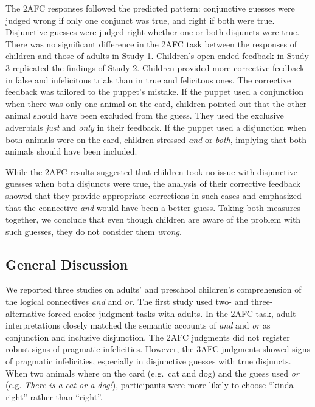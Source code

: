 \documentclass[floatsintext,man]{apa6}
\theoremstyle{definition}
\theoremstyle{definition}
\theoremstyle{definition}
\theoremstyle{remark}
\begin{document}
The 2AFC responses followed the predicted pattern: conjunctive guesses
were judged wrong if only one conjunct was true, and right if both were
true. Disjunctive guesses were judged right whether one or both
disjuncts were true. There was no significant difference in the 2AFC
task between the responses of children and those of adults in Study 1.
Children's open-ended feedback in Study 3 replicated the findings of
Study 2. Children provided more corrective feedback in false and
infelicitous trials than in true and felicitous ones. The corrective
feedback was tailored to the puppet's mistake. If the puppet used a
conjunction when there was only one animal on the card, children pointed
out that the other animal should have been excluded from the guess. They
used the exclusive adverbials \emph{just} and \emph{only} in their
feedback. If the puppet used a disjunction when both animals were on the
card, children stressed \emph{and} or \emph{both}, implying that both
animals should have been included.

While the 2AFC results suggested that children took no issue with
disjunctive guesses when both disjuncts were true, the analysis of their
corrective feedback showed that they provide appropriate corrections in
such cases and emphasized that the connective \emph{and} would have been
a better guess. Taking both measures together, we conclude that even
though children are aware of the problem with such guesses, they do not
consider them \emph{wrong}.

\subsection{General Discussion}\label{discussion}

We reported three studies on adults' and preschool children's
comprehension of the logical connectives \emph{and} and \emph{or}. The
first study used two- and three-alternative forced choice judgment tasks
with adults. In the 2AFC task, adult interpretations closely matched the
semantic accounts of \emph{and} and \emph{or} as conjunction and
inclusive disjunction. The 2AFC judgments did not register robust signs
of pragmatic infelicities. However, the 3AFC judgments showed signs of
pragmatic infelicities, especially in disjunctive guesses with true
disjuncts. When two animals where on the card (e.g.~cat and dog) and the
guess used \emph{or} (e.g. \emph{There is a cat or a dog!}),
participants were more likely to choose \enquote{kinda right} rather
than \enquote{right}.
\end{document}
